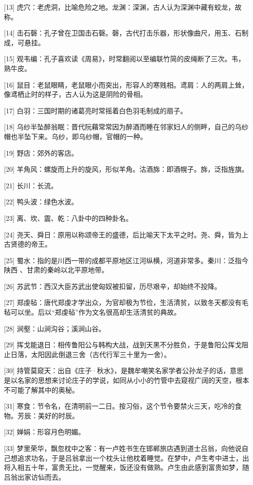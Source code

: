 \documentclass[12pt,UTF8]{ctexbook}
\begin{document}
[13] 虎穴：老虎洞，比喻危险之地。龙渊：深渊，古人认为深渊中藏有蛟龙，故称。

[14] 击石磬：孔子曾在卫国击石磬。磬，古代打击乐器，形状像曲尺，用玉、石制成，可悬挂。

[15] 观韦编：孔子喜欢读《周易》，时常翻阅以至编联竹简的皮绳断了三次。韦，熟牛皮。

[16] 鼠目：老鼠眼睛，老鼠眼小而突出，形容人的寒贱相。鸢肩：人的两肩上耸，像鸢栖止时的样子，古人认为这是阴险的骨相。

[17] 白羽：三国时期的诸葛亮时常摇着白色羽毛制成的扇子。

[18] 乌纱半坠醉翁眠：晋代阮藉常常因为醉酒而睡在邻家妇人的侧畔，自己的乌纱帽也半坠下来。乌纱，即乌纱帽，官帽的一种。

[19] 野店：郊外的客店。

[20] 羊角风：螺旋而上升的旋风，形似羊角。沽酒旆：即酒幌子。旆，泛指旌旗。

[21] 长川：长流。

[22] 鸭头波：绿色水波。

[23] 离、坎、震、乾：八卦中的四种卦名。

[24] 尧天、舜日：原用以称颂帝王的盛德，后比喻天下太平之时。尧、舜，皆为上古贤德的帝王。

[25] 蜀水：指的是川西一带的成都平原地区江河纵横，河道非常多。秦川：泛指今陕西 、甘肃的秦岭以北平原地带。

[26] 苏武节：西汉大臣苏武出使匈奴被扣留，历尽艰辛，却始终不投降。

[27] 郑虔毡：唐代郑虔才学出众，为官却极为节俭，生活清贫，以致冬天都没有毛毡可以坐。后以“郑虔毡”作为文名很高却生活清贫的典故。

[28] 涧壑：山涧沟谷；溪涧山谷。

[29] 挥戈能退日：相传鲁阳公与韩构大战，战到天黑不分胜负，于是鲁阳公挥戈阻止日落，太阳因此倒退三舍（古代行军三十里为一舍）。

[30] 持管莫窥天：出自《庄子·秋水》，是魏牟嘲笑名家学者公孙龙子的话，意思是以名家的思想来讨论庄子的学说，如同从小小的竹管中去窥视广阔的天空，根本不可能了解其中的奥秘。

[31] 寒食：节令名，在清明前一二日。按习俗，这个节令要禁火三天，吃冷的食物。芳辰：美好的时辰。

[32] 婵娟：形容月色明媚。

[33] 梦里荣华，飘忽枕中之客：有一卢姓书生在邯郸旅店遇到道士吕翁，向他说自己想追求功名，于是吕翁拿出一个枕头让他枕着睡觉。在梦中，卢生考中进士，出将入相五十年，富贵无比，一觉醒来，饭还没有做熟。卢生由此感到富贵如梦，随吕翁出家访仙而去。
\end{document}
